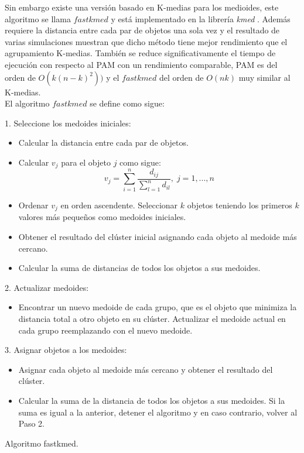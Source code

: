 \documentclass[12pt]{report} %
\theoremstyle{definition}
\begin{document}
{Sin embargo existe una versión basado en K-medias para los medioides, este algoritmo se llama $fastkmed$ y está implementado en la librería \textit{kmed} \cite{kmed}. Además requiere la distancia entre cada par de objetos una sola vez y el resultado de varias simulaciones muestran que dicho método tiene mejor rendimiento que el agrupamiento K-medias. También se reduce significativamente el tiempo de ejecución con respecto al PAM con un rendimiento comparable, PAM es del orden de $O(k(n-k)^2))$ y el $fastkmed$ del orden de $O(nk)$ muy similar al K-medias. \cite{kmedarticle}\\

El algoritmo $fastkmed$ se define como sigue:\\

\begin{algorithm}[H] 
	\SetAlgoLined
	1. Seleccione los medoides iniciales:
	\begin{itemize}
		\item Calcular la distancia entre cada par de objetos.
		\item Calcular $v_j$ para el objeto $j$ como sigue:
		$$ v_j =  \sum_{i=1}^{n}  \frac{d_{ij}}{\sum_{l=1}^{n} d_{il}}, \; j=1,...,n$$
		\item  Ordenar $v_j$ en orden ascendente. Seleccionar $k$ objetos teniendo los primeros $k$ valores más pequeños como medoides iniciales.
		\item Obtener el resultado del clúster inicial asignando cada objeto al medoide más cercano.
		\item  Calcular la suma de distancias de todos los objetos a sus medoides.
	\end{itemize}
	2. Actualizar medoides:
	\begin{itemize}
	\item Encontrar un nuevo medoide de cada grupo, que es el objeto que minimiza la distancia total a otro objeto en su clúster. Actualizar el medoide actual en cada grupo reemplazando con el nuevo medoide.
	\end{itemize}
    3. Asignar objetos a los medoides:
    \begin{itemize}
    	\item Asignar cada objeto al medoide más cercano y obtener el resultado del clúster.
    	\item Calcular la suma de la distancia de todos los objetos a sus medoides. Si la suma es igual a la anterior, detener el algoritmo y en caso contrario, volver al Paso 2.
    \end{itemize}
	\caption{Algoritmo fastkmed.}
\end{algorithm}
\vspace{0.5cm}

}
\end{document}
